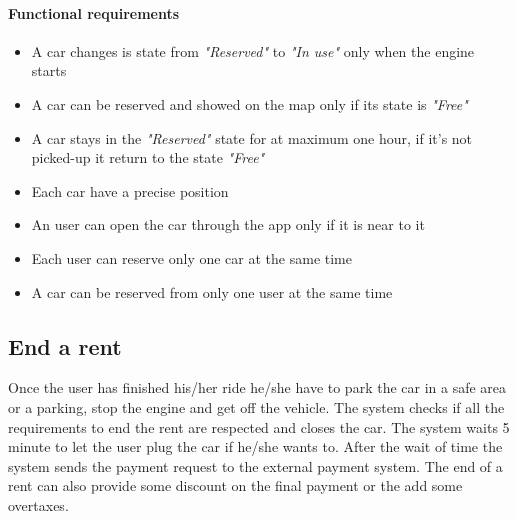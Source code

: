 \paragraph{Functional requirements }
\begin{itemize}
	\item A car changes is state from \emph{"Reserved"} to \emph{"In use"} only when the engine starts
	\item A car can be reserved and showed on the map only if its state is \emph{"Free"}
	\item A car stays in the \emph{"Reserved"} state for at maximum one hour, if it's not picked-up it return to the state \emph{"Free"}
	\item Each car have a precise position
	\item An user can open the car through the app only if it is near to it
	\item Each user can reserve only one car at the same time
	\item A car can be reserved from only one user at the same time
\end{itemize}

\subsection{End a rent}
Once the user has finished his/her ride he/she have to park the car in a safe area or a parking, stop the engine and get off the vehicle. The system checks if all the requirements to end the rent are respected and closes the car. The system waits 5 minute to let the user plug the car if he/she wants to. After the wait of time the system sends the payment request to the external payment system. The end of a rent can also provide some discount on the final payment or the add some overtaxes.
